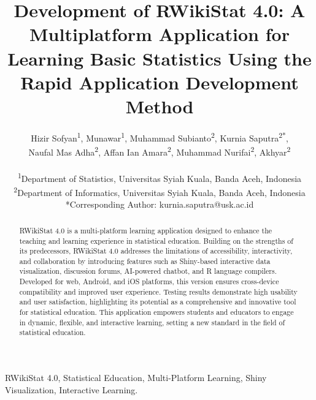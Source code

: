 \documentclass[conference,a4paper]{IEEEtran}
\begin{document}
\title{
  Development of RWikiStat 4.0: A Multiplatform Application for Learning Basic Statistics Using the Rapid Application Development Method \\
}

\makeatletter
\newcommand{\linebreakand}{
  \end{@IEEEauthorhalign}
  \hfill\mbox{}\par
  \mbox{}\hfill\begin{@IEEEauthorhalign}
}
\makeatother

\author{
  Hizir Sofyan\textsuperscript{1}, Munawar\textsuperscript{1}, Muhammad Subianto\textsuperscript{2}, Kurnia Saputra\textsuperscript{2*},\\
  Naufal Mas Adha\textsuperscript{2}, Affan Ian Amara\textsuperscript{2}, Muhammad Nurifai\textsuperscript{2}, Akhyar\textsuperscript{2}\\
  \\
  \textsuperscript{1}Department of Statistics, Universitas Syiah Kuala, Banda Aceh, Indonesia\\
  \textsuperscript{2}Department of Informatics, Universitas Syiah Kuala, Banda Aceh, Indonesia\\
  *Corresponding Author: kurnia.saputra@usk.ac.id
}

\maketitle

\begin{abstract}
  RWikiStat 4.0 is a multi-platform learning application designed to enhance the teaching and learning experience in statistical education. Building on the strengths of its predecessors, RWikiStat 4.0 addresses the limitations of accessibility, interactivity, and collaboration by introducing features such as Shiny-based interactive data visualization, discussion forums, AI-powered chatbot, and R language compilers. Developed for web, Android, and iOS platforms, this version ensures cross-device compatibility and improved user experience. Testing results demonstrate high usability and user satisfaction, highlighting its potential as a comprehensive and innovative tool for statistical education. This application empowers students and educators to engage in dynamic, flexible, and interactive learning, setting a new standard in the field of statistical education.
\end{abstract}

\begin{IEEEkeywords}
  RWikiStat 4.0, Statistical Education, Multi-Platform Learning, Shiny Visualization, Interactive Learning.
\end{IEEEkeywords}
\end{document}
